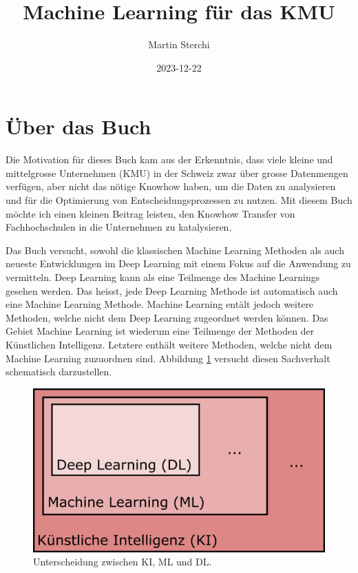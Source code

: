 \documentclass[
]{book}
\title{Machine Learning für das KMU}
\author{Martin Sterchi}
\date{2023-12-22}
\begin{document}
\maketitle

{
\setcounter{tocdepth}{1}
\tableofcontents
}
\hypertarget{uxfcber-das-buch}{%
\chapter*{Über das Buch}\label{uxfcber-das-buch}}

Die Motivation für dieses Buch kam aus der Erkenntnis, dass viele kleine und mittelgrosse Unternehmen (KMU) in der Schweiz zwar über grosse Datenmengen verfügen, aber nicht das nötige Knowhow haben, um die Daten zu analysieren und für die Optimierung von Entscheidungsprozessen zu nutzen. Mit diesem Buch möchte ich einen kleinen Beitrag leisten, den Knowhow Transfer von Fachhochschulen in die Unternehmen zu katalysieren.

Das Buch versucht, sowohl die klassischen Machine Learning Methoden als auch neueste Entwicklungen im Deep Learning mit einem Fokus auf die Anwendung zu vermitteln. Deep Learning kann als eine Teilmenge des Machine Learnings gesehen werden. Das heisst, jede Deep Learning Methode ist automatisch auch eine Machine Learning Methode. Machine Learning entält jedoch weitere Methoden, welche nicht dem Deep Learning zugeordnet werden können. Das Gebiet Machine Learning ist wiederum eine Teilmenge der Methoden der Künstlichen Intelligenz. Letztere enthält weitere Methoden, welche nicht dem Machine Learning zuzuordnen sind. Abbildung \ref{fig:kimldl} versucht diesen Sachverhalt schematisch darzustellen.

\begin{figure}

{\centering \includegraphics[width=0.6\linewidth]{images/KI_ML_DL} 

}

\caption{Unterscheidung zwischen KI, ML und DL. }\label{fig:kimldl}
\end{figure}
\end{document}

